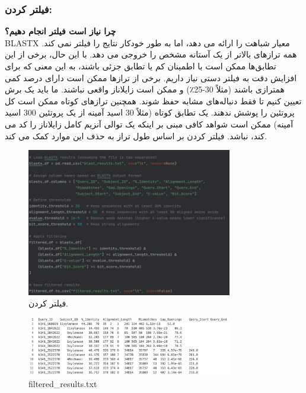     \subsubsection*{فیلتر کردن:}
        \textbf{چرا نیاز است فیلتر انجام دهیم؟}\\
        BLASTX معیار شباهت را ارائه می دهد، اما به طور خودکار نتایج را فیلتر نمی کند. همه ترازهای بالاتر از یک آستانه مشخص را خروجی می دهد. با این حال، برخی از این تطابق‌ها ممکن است با اطمینان کم یا تطابق جزئی باشند، به این معنی که برای افزایش دقت به فیلتر دستی نیاز داریم.
        برخی از ترازها ممکن است دارای درصد کمی همترازی باشند (مثلاً 30-25٪) و ممکن است زایلاناز واقعی نباشند. ما باید یک برش تعیین کنیم تا فقط دنباله‌های مشابه‌ حفظ شوند. همچنین ترازهای کوتاه ممکن است کل پروتئین را پوشش ندهند. یک تطابق کوتاه (مثلاً 30 اسید آمینه از یک پروتئین 300 اسید آمینه) ممکن است شواهد کافی مبنی بر اینکه یک توالی آنزیم کامل زایلاناز را کد می کند، نباشد. فیلتر کردن بر اساس طول تراز به حذف این موارد کمک می کند.
        \begin{figure}[H]
            \centering
            \includegraphics[width=0.8\textwidth]{images/step1_filter.jpg} %
            \caption{فیلتر کردن.}
            \label{fig:step1_filter}
        \end{figure}
        \begin{figure}[H]
            \centering
            \includegraphics[width=0.8\textwidth]{images/filtered_results.jpg} %
            \caption{filtered\_results.txt}
            \label{fig:filtered_results}
        \end{figure}
